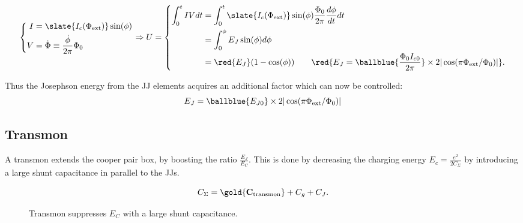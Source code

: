 \begin{itemize}
  \begin{equation}
    \left\{\begin{aligned}
        I &= \slate{I_c(\Phi_\text{ext})}\sin(\phi)\\
        V&=\dot{\Phi} \equiv \frac{\dot{\phi}}{2\pi}\Phi_0
      \end{aligned}\right.  \Rightarrow U =
    \left\{
      \begin{aligned}
        \int_{0}^{t}IV dt & = \int_{0}^{t}\slate{I_c(\Phi_\text{ext})}\sin(\phi)\frac{\Phi_0}{2\pi}\frac{d\phi}{dt}dt\\
        & = \int_{0}^{\phi} E_J\sin(\phi)d\phi\\
        &      =      \red{E_J}(1-\cos(\phi))     \qquad      \red{E_J      =
          \ballblue{\frac{\Phi_0I_{c0}}{2\pi}}                      \times
          2|\cos(\pi\Phi_\text{ext}/\Phi_0)|}.
      \end{aligned}\right.
  \end{equation}
  \begin{framed}\noindent
    Thus  the  Josephson energy  from  the  JJ elements  acquires  an
    additional factor which can now be controlled:
    \begin{equation}
      E_J = \ballblue{E_{J0}} \times 2|\cos(\pi\Phi_\text{ext}/\Phi_0)|
    \end{equation}
  \end{framed}
\end{itemize}

\subsection{Transmon}
\label{sec:transmon}

A  transmon  extends the  cooper  pair  box,  by boosting  the  ratio
$\frac{E_{J}}{E_{C}}$.   This  is  done by  decreasing  the  charging
energy  $E_c= \frac{e^2}{2C_\Sigma}$  by  introducing  a large  shunt
capacitance in parallel to the JJs.

\begin{framed}\noindent
  \begin{equation}
    C_{\Sigma} =  \gold{\mathbf{C_\text{transmon}}} + C_g  + C_J.
  \end{equation}
\end{framed}

\begin{figure}[h]
  \centering {}
  \caption{\small  Transmon suppresses  $E_{C}$  with  a large  shunt
    capacitance. \label{fig:cooper_pair_box_4_transmon}}
\end{figure}


